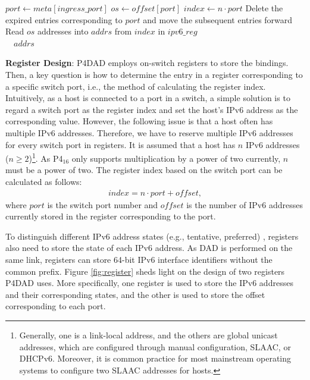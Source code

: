 \documentclass[journal]{IEEEtran}
\begin{document}
\begin{algorithm}[!t]
\begin{algorithmic}[1]
            \State
                \State $port \gets meta[ingress\_port]$
                \State $os \gets o\!f\!\!f\!set[port]$
                \State $index \gets n \cdot port$
                \State Delete the expired entries corresponding to $port$ and move the subsequent entries forward
                \State Read $os$ addresses into $addrs$ from $index$ in $ipv6\_reg$\\
                \quad\ \  \Return $addrs$ 
            \EndFunction
            \end{algorithmic}
        \end{algorithm}

        \textbf{Register Design}: P4DAD employs on-switch registers to store the bindings. Then, a key question is how to determine the entry in a register corresponding to a specific switch port, i.e., the method of calculating the register index.  
        Intuitively, as a host is connected to a port in a switch, a simple solution is to regard a switch port as the register index and set the host's IPv6 address as the corresponding value. 
        However, the following issue is that a host often has multiple IPv6 addresses. Therefore, we have to reserve multiple IPv6 addresses for every switch port in registers. 
        It is assumed that a host has $n$ IPv6 addresses ($n \geq 2$)\footnote{Generally, one is a link-local address, and the others are global unicast addresses, which are configured through manual configuration, SLAAC, or DHCPv6. Moreover, it is common practice for most mainstream operating systems to configure two SLAAC addresses for hosts.}. As P4$_{16}$ \cite{P4-16} only supports multiplication by a power of two currently, $n$ must be a power of two.
        The register index based on the switch port can be calculated as follows: 
        \begin{equation}
                \label{index-calculation}
                \begin{aligned}
                    index = n \cdot port + of\!fset,
                \end{aligned}
        \end{equation}
        where $port$ is the switch port number and $of\!fset$ is the number of IPv6 addresses currently stored in the register corresponding to the port. 

        To distinguish different IPv6 address states (e.g., tentative, preferred) \cite{slaac}, registers also need to store the state of each IPv6 address. As DAD is performed on the same link, registers can store 64-bit IPv6 interface identifiers without the common prefix. Figure \ref{fig:register} sheds light on the design of two registers P4DAD uses. More specifically, one register is used to store the IPv6 addresses and their corresponding states, and the other is used to store the offset corresponding to each port.
\end{document}
